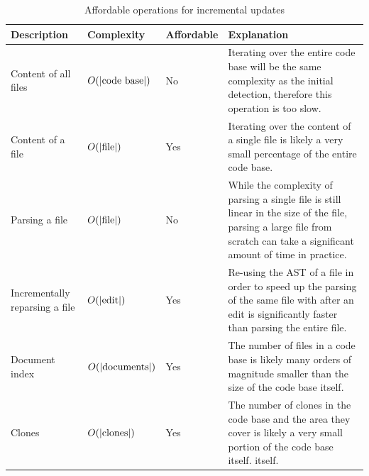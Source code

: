 \begin{table}[t!]
	\begin{center}
		\begin{tabular}{|p{1in} | p{1in} | p{0.6in} | p{2.5in}|}
			\hline

			Description                    & Complexity              & Affordable & Explanation                               \\\hline

			Content of all files           & $O(|\Var{code\ base}|)$ & No         & Iterating over the
			entire code base will be the same complexity as the initial detection,
			therefore this operation is too slow.                                                                             \\\hline

			Content of a file              & $O(|\mathrm{file}|)$       & Yes        & Iterating over the content
			of a single file is likely a very small percentage of the entire code
			base.                                                                                                             \\\hline

			Parsing a file                 & $O(|\mathrm{file}|)$       & No         & While the complexity of
			parsing a single file is still linear in the size of the file, parsing a large
			file from scratch can take a significant amount of time in practice.                                              \\\hline

			Incrementally reparsing a file & $O(|\mathrm{edit}|)$       & Yes        & Re-using the
			AST of a file in order to speed up the parsing of the same file with
			after an edit is significantly faster than parsing the entire file.                                               \\\hline

			Document index                 & $O(|\mathrm{documents}|)$  & Yes        & The number of files in a code
			base is likely many orders of magnitude smaller than the size of the code base
			itself.                                                                                                           \\\hline

			Clones                         & $O(|\mathrm{clones}|)$     & Yes        & The number of clones in the code base and
			the area they cover is likely a very small portion of the code base itself.
			itself.                                                                                                           \\\hline
		\end{tabular}
		\caption{Affordable operations for incremental updates}
		\label{table:affordableoperations}
	\end{center}
\end{table}



